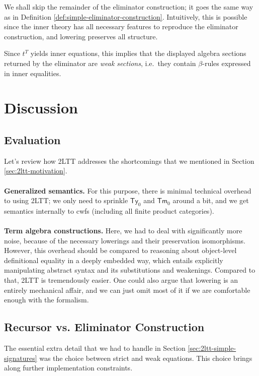 \documentclass[12pt,a4paper,twoside,openany]{book}
\theoremstyle{remark}
\theoremstyle{definition}
\theoremstyle{theorem}
\newcommand{\Tm}{\mathsf{Tm}}
\newcommand{\Ty}{\mathsf{Ty}}
\begin{document}
We shall skip the remainder of the eliminator construction; it goes the same way
as in Definition \ref{def:simple-eliminator-construction}. Intuitively, this is
possible since the inner theory has all necessary features to reproduce the
eliminator construction, and lowering preserves all structure.

Since $t^T$ yields inner equations, this implies that the displayed algebra
sections returned by the eliminator are \emph{weak sections}, i.e.\ they contain
$\beta$-rules expressed in inner equalities.

\section{Discussion}

\subsection{Evaluation}

Let's review how 2LTT addresses the shortcomings that we mentioned in Section
\ref{sec:2ltt-motivation}.
\\\\
\textbf{Generalized semantics.} For this purpose, there is minimal
technical overhead to using 2LTT; we only need to sprinkle $\Ty_0$ and $\Tm_0$
around a bit, and we get semantics internally to cwfs (including all finite product
categories).
\\\\
\textbf{Term algebra constructions.}
Here, we had to deal with significantly more noise, because of the necessary
lowerings and their preservation isomorphisms. However, this overhead should be
compared to reasoning about object-level definitional equality in a deeply
embedded way, which entails explicitly manipulating abstract syntax and its
substitutions and weakenings. Compared to that, 2LTT is tremendously easier. One
could also argue that lowering is an entirely mechanical affair, and we can just
omit most of it if we are comfortable enough with the formalism.

\subsection{Recursor vs. Eliminator Construction}

The essential extra detail that we
had to handle in Section \ref{sec:2ltt-simple-signatures} was the choice between
strict and weak equations. This choice brings along further implementation
constraints.
\end{document}
